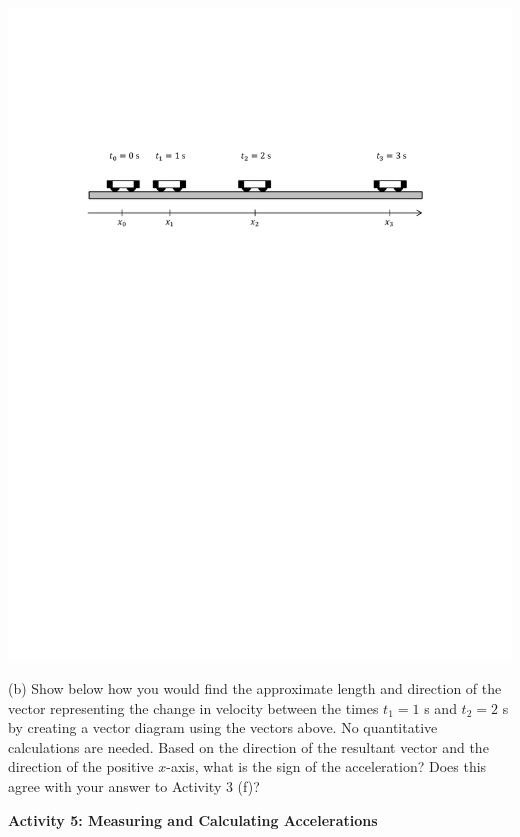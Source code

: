 \vspace{0.3cm}
{\par\centering \includegraphics{changing/carts_const_a.pdf} \par}
\vspace{0.3cm}

(b) Show below how you would find the approximate length and direction of the
vector representing the change in velocity between the times $t_1 = 1$ s and $t_2 = 2$ s
by creating a vector diagram using the vectors above. No quantitative 
calculations are needed. Based on the direction of the resultant vector and 
the direction of the positive $x$-axis, what is the sign of the acceleration? 
Does this agree with your answer to Activity 3 (f)?
\answerspace{20mm}

\textbf{Activity 5: Measuring and Calculating Accelerations}

